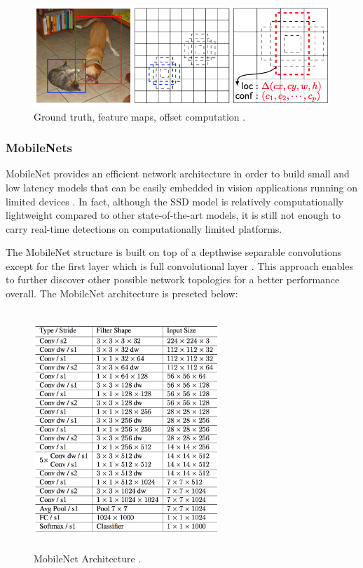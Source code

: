 \begin{figure}[!htbp]
\begin{center}
\includegraphics[width=\linewidth]{images/gt_boxes.png}
\end{center}
\caption{Ground truth, feature maps, offset computation \cite{paper:SSD}.}
\label{fig:ssdGT}
\end{figure}

\subsubsection{MobileNets}

MobileNet provides an efficient network architecture in order to build small and low latency models that can be easily embedded in vision applications running on limited devices \cite{paper:MobileNets}. In fact, although the SSD model is relatively computationally lightweight compared to other state-of-the-art models, it is still not enough to carry real-time detections on computationally limited platforms.

The MobileNet structure is built on top of a depthwise separable convolutions except for the first layer which is full convolutional layer \cite{paper:MobileNets}. This approach enables to further discover other possible network topologies for a better performance overall. The MobileNet architecture is preseted below:

\begin{figure}[!htbp]
\begin{center}
\includegraphics[width=7cm,height=9cm,keepaspectratio]{images/mobileNet_structure.png}
\end{center}
\caption{MobileNet Architecture \cite{paper:MobileNets}.}
\end{figure}

